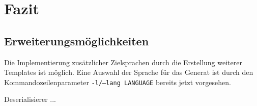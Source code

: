 \section{Fazit}

\subsection{Erweiterungsmöglichkeiten}
\label{sec:erweiterung}

Die Implementierung zusätzlicher Zielsprachen durch die Erstellung weiterer Templates ist möglich. Eine Auswahl der Sprache für das Generat ist durch den Kommandozeilenparameter \texttt{-l/--lang LANGUAGE} bereits jetzt vorgesehen.

Deserialisierer ...